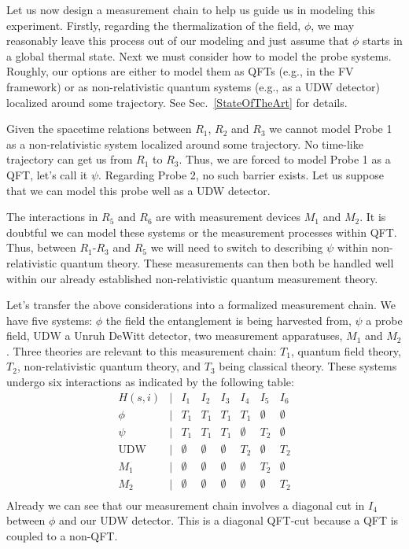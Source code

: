 \documentclass[prd,twocolumn,superscriptaddress,floatfix,amsmath,amssymb,amsfonts,nofootinbib]{revtex4-2}
\begin{document}
Let us now design a measurement chain to help us guide us in modeling this experiment. Firstly, regarding the thermalization of the field, $\phi$, we may reasonably leave this process out of our modeling and just assume that $\phi$ starts in a global thermal state. Next we must consider how to model the probe systems. Roughly, our options are either to model them as QFTs (e.g., in the FV framework) or as non-relativistic quantum systems (e.g., as a UDW detector) localized around some trajectory. See Sec.~\ref{StateOfTheArt} for details.

Given the spacetime relations between $R_1$, $R_2$ and $R_3$ we cannot model Probe 1 as a non-relativistic system localized around some trajectory. No time-like trajectory can get us from $R_1$ to $R_3$. Thus, we are forced to model Probe 1 as a QFT, let's call it $\psi$. Regarding Probe 2, no such barrier exists. Let us suppose that we can model this probe well as a UDW detector. 

The interactions in $R_5$ and $R_6$ are with measurement devices $M_1$ and $M_2$. It is doubtful we can model these systems or the measurement processes within QFT. Thus, between $R_1$-$R_3$ and $R_5$ we will need to switch to describing $\psi$ within non-relativistic quantum theory. These measurements can then both be handled well within our already established non-relativistic quantum measurement theory. 

Let's transfer the above considerations into a formalized measurement chain. We have five systems: $\phi$ the field the entanglement is being harvested from, $\psi$ a probe field, $\text{UDW}$ a Unruh DeWitt detector, two measurement apparatuses, $M_1$ and $M_2$. Three theories are relevant to this measurement chain: $T_1$, quantum field theory, $T_2$, non-relativistic quantum theory, and $T_3$ being classical theory. These systems undergo six interactions as indicated by the following table:
\[\begin{array}{cccccccc}
H(s,i) & \vert & I_1 & I_2 & I_3 & I_4 & I_5 & I_6\\
\phi & \vert & T_1 & T_1 & T_1 & T_1 & \emptyset & \emptyset\\
\psi & \vert & T_1 & T_1 & T_1 & \emptyset & T_2 & \emptyset\\
\text{UDW} & \vert & \emptyset & \emptyset & \emptyset & T_2 & \emptyset & T_2\\
M_1 & \vert & \emptyset & \emptyset & \emptyset & \emptyset & T_2 & \emptyset\\
M_2 & \vert & \emptyset & \emptyset & \emptyset & \emptyset & \emptyset & T_2\\
\end{array}\]
Already we can see that our measurement chain involves a diagonal cut in $I_4$ between $\phi$ and our $\text{UDW}$ detector. This is a diagonal QFT-cut because a QFT is coupled to a non-QFT.
\end{document}
